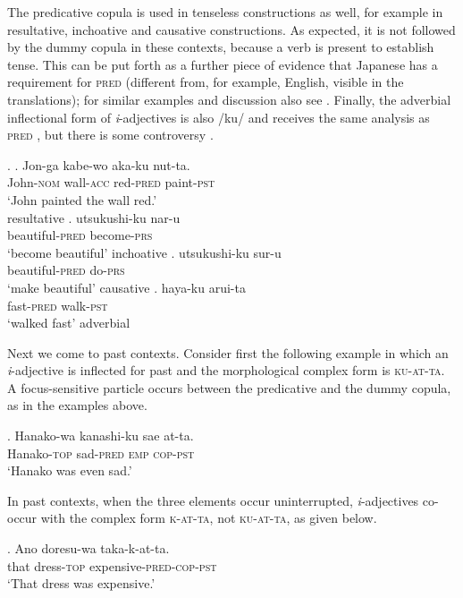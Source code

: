 The predicative copula is used in tenseless constructions as well, for example in resultative, inchoative and causative constructions. As expected, it is not followed by the dummy copula in these contexts, because a verb is present to establish tense. This can be put forth as a further piece of evidence that Japanese has a requirement for \textsc{pred} (different from, for example,  English, visible in the translations); for similar examples and discussion also see \citet[8–10]{yamada:2023:looking}. Finally, the adverbial inflectional form of \textit{i}-adjectives is also /ku/ and receives the same analysis as \textsc{pred} \citep{nishiyama:2005:baker}, but there is some controversy \citep{namai:2002:word}.

\ex. \ag. Jon-ga kabe-wo aka-ku nut-ta.\\
John-\textsc{nom} wall-\textsc{acc} red-\textsc{pred} paint-\textsc{pst}\\
`John painted the wall red.’ \\ \null\hfill resultative \citep[153]{nishiyama:2005:baker}
\bg. utsukushi-ku nar-u\\
beautiful-\textsc{pred} become-\textsc{prs}\\
`become beautiful' \null \hfill inchoative
\cg. utsukushi-ku sur-u\\
beautiful-\textsc{pred} do-\textsc{prs}\\
`make beautiful' \null \hfill causative
\dg. haya-ku arui-ta\\
fast-\textsc{pred} walk-\textsc{pst}\\
`walked fast' \null \hfill adverbial

Next we come to past contexts. Consider first the following example in which an \textit{i}-adjective is inflected for past and the morphological complex form is \textsc{ku-at-ta}. A focus-sensitive particle occurs between the predicative and the dummy copula, as in the examples above.

\exg. Hanako-wa kanashi-ku sae at-ta.\\
Hanako-\textsc{top} sad-\textsc{pred} \textsc{emp} \textsc{cop-pst}\\
`Hanako was even sad.' \null\hfill \citep[109]{kubo:1992:japanese}

In past contexts, when the three elements occur uninterrupted, \textit{i}-adjectives co-occur with the complex form \textsc{k-at-ta}, not \textsc{ku-at-ta}, as given below.

\exg. Ano doresu-wa taka-k-at-ta.\\
that dress-\textsc{top} expensive-\textsc{pred-cop-pst}\\
`That dress was expensive.'

